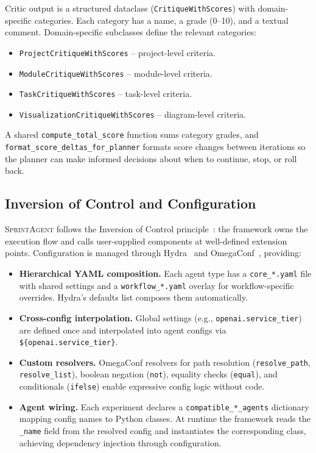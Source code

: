 \documentclass[11pt, a4paper]{article}
\newcommand{\sprintagent}{\textsc{SprintAgent}}
\newcommand{\ioc}{Inversion of Control}
\begin{document}
Critic output is a structured dataclass (\texttt{CritiqueWithScores})
with domain-specific categories.  Each category has a name, a grade
(0--10), and a textual comment.  Domain-specific subclasses define the
relevant categories:

\begin{itemize}[leftmargin=*]
  \item \texttt{ProjectCritiqueWithScores} -- project-level criteria.
  \item \texttt{ModuleCritiqueWithScores} -- module-level criteria.
  \item \texttt{TaskCritiqueWithScores} -- task-level criteria.
  \item \texttt{VisualizationCritiqueWithScores} -- diagram-level criteria.
\end{itemize}

A shared \texttt{compute\_total\_score} function sums category grades,
and \texttt{format\_score\_deltas\_for\_planner} formats score changes
between iterations so the planner can make informed decisions about
when to continue, stop, or roll back.

\subsection{Inversion of Control and Configuration}
\label{sec:ioc}

\sprintagent{} follows the \ioc{} principle~\cite{fowler2004ioc}: the
framework owns the execution flow and calls user-supplied components at
well-defined extension points.  Configuration is managed through
Hydra~\cite{hydra2019} and OmegaConf~\cite{omegaconf2019}, providing:

\begin{itemize}[leftmargin=*]
  \item \textbf{Hierarchical YAML composition.}  Each agent type has a
    \texttt{core\_*.yaml} file with shared settings and a
    \texttt{workflow\_*.yaml} overlay for workflow-specific overrides.
    Hydra's defaults list composes them automatically.
  \item \textbf{Cross-config interpolation.}  Global settings (e.g.,
    \texttt{openai.service\_tier}) are defined once and interpolated
    into agent configs via \texttt{\$\{openai.service\_tier\}}.
  \item \textbf{Custom resolvers.}  OmegaConf resolvers for path
    resolution (\texttt{resolve\_path}, \texttt{resolve\_list}),
    boolean negation (\texttt{not}), equality checks (\texttt{equal}),
    and conditionals (\texttt{ifelse}) enable expressive config logic
    without code.
  \item \textbf{Agent wiring.}  Each experiment declares a
    \texttt{compatible\_*\_agents} dictionary mapping config names to
    Python classes.  At runtime the framework reads the
    \texttt{\_name} field from the resolved config and instantiates the
    corresponding class, achieving dependency injection through
    configuration.
\end{itemize}
\end{document}
